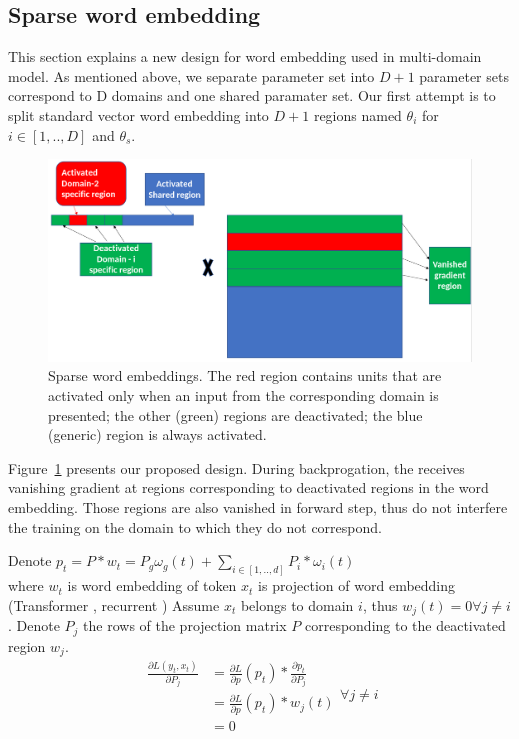 \documentclass[11pt,a4paper]{article}
\newcommand{\fyTodo}[1]{\Todo[FY:]{\textcolor{orange}{#1}}}
\begin{document}
\subsection{Sparse word embedding}
\label{sec:sparse}
This section explains a new design for word embedding used in multi-domain model. As mentioned above, we separate parameter set into $D+1$ parameter sets correspond to D domains and one shared paramater set. Our first attempt is to split standard vector word embedding into $D+1$ regions named $\theta_i$ for $i \in [1,..,D]$ and $\theta_s$.
\begin{figure}[h]
\center
    \includegraphics[width=0.8\linewidth]{Sparse1}
    \caption{Sparse word embeddings. The red region contains units that are activated only when an input from the corresponding domain is presented; the other (green) regions are deactivated; the blue (generic) region is always activated.} 
    \label{fig:network}
  \end{figure}
\fyTodo{Explain vanishing ?}
Figure~\ref{fig:network} presents our proposed design. During backprogation, the \fyTodo{fix notation}{projection matrix $P$} receives vanishing gradient at regions corresponding to deactivated regions in the word embedding. Those regions are also vanished in forward step, thus do not interfere the training on the domain to which they do not correspond.

Denote
$p_{t} = P * w_{t} = P_g \omega_g(t) + \displaystyle{\mathop{\sum}_{i \in [1,..,d]} P_i * \omega_i(t)}$\\
where $w_{t}$ is word embedding of token $x_{t}$  is projection of word embedding (Transformer \cite{Vaswani17attention}, recurrent \cite{bahdanau2014neural})
Assume $x_{t}$ belongs to domain $i$, thus $w_j(t) = 0 \forall j \neq i$. Denote $P_j$ the rows of the projection matrix $P$ corresponding to the deactivated region $w_j$.
\begin{equation}
\begin{split}
\frac{\partial L(y_t,x_t)}{\partial P_j} &=\frac{\partial L}{\partial p}(p_t) * \frac{\partial p_t}{\partial P_j} \\
								&= \frac{\partial L}{\partial p}(p_t) * w_j(t)\\
									&=0
\end{split} 
\forall j \neq i
\end{equation}
\end{document}
